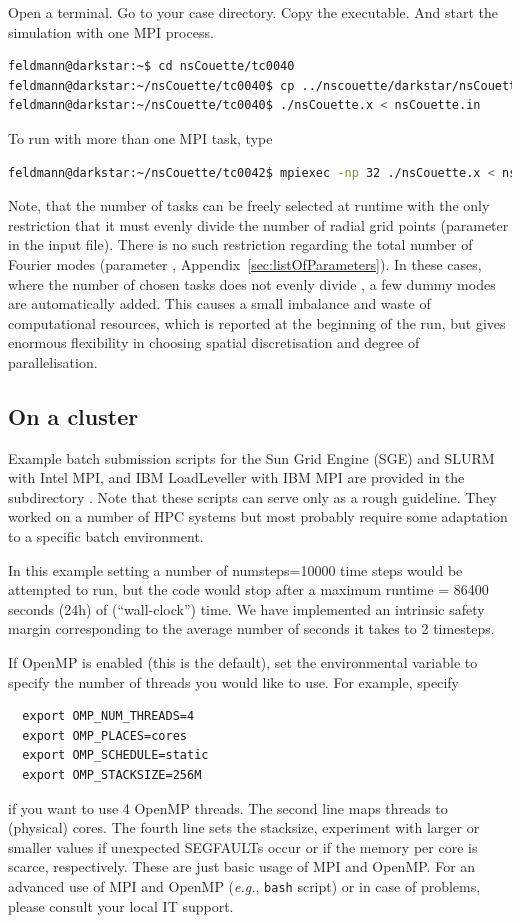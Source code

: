 \documentclass[a4paper, 11pt, DIV=11]{scrartcl}
\begin{document}
Open a terminal. Go to your case directory. Copy the executable. And start the simulation with one MPI process.
\begin{lstlisting}[language=bash]
feldmann@darkstar:~$ cd nsCouette/tc0040
feldmann@darkstar:~/nsCouette/tc0040$ cp ../nscouette/darkstar/nsCouette.x .
feldmann@darkstar:~/nsCouette/tc0040$ ./nsCouette.x < nsCouette.in
\end{lstlisting}
To run \nsc with more than one MPI task, type
\begin{lstlisting}[language=bash]
feldmann@darkstar:~/nsCouette/tc0042$ mpiexec -np 32 ./nsCouette.x < nsCouette.in
\end{lstlisting}
Note, that the number of \mpi tasks can be freely selected at runtime with the only
restriction that it must evenly divide the number of radial grid points (parameter
 in the input file). There is no such restriction regarding the total number
of Fourier modes (parameter , Appendix~\ref{sec:listOfParameters}). In these
cases, where the number of chosen \mpi tasks does not evenly divide , a few
dummy modes are automatically added. This causes a small imbalance and waste of
computational resources, which is reported at the beginning of the run, but gives
enormous flexibility in choosing spatial discretisation and degree of parallelisation.


\subsection{On a cluster}
\label{sec:onCluster}

Example batch submission scripts for the Sun Grid Engine (SGE) and
SLURM with Intel MPI, and IBM LoadLeveller with IBM MPI are provided
in the subdirectory . Note that these scripts can serve only
as a rough guideline. They worked on a number of HPC systems but most
probably require some adaptation to a specific batch environment.


In this example setting a number of numsteps=10000 time steps would be
attempted to run, but the code would stop after a maximum runtime =
86400 seconds (24h) of (``wall-clock'') time. We have implemented an intrinsic
safety margin corresponding to the average number of seconds it takes to 2
timesteps.

If OpenMP is enabled (this is the default), set the 
environmental variable to specify the number of threads you would like to use. 
For example, specify
\begin{verbatim}
  export OMP_NUM_THREADS=4
  export OMP_PLACES=cores
  export OMP_SCHEDULE=static
  export OMP_STACKSIZE=256M
\end{verbatim}
if you want to use 4 OpenMP threads. The second line maps threads to
(physical) cores. The fourth line sets the stacksize, experiment with
larger or smaller values if unexpected SEGFAULTs occur or if the
memory per core is scarce, respectively.
These are just basic usage of MPI and OpenMP. 
For an advanced use of MPI and OpenMP (\textit{e.g.}, \verb+bash+ script) or in 
case of problems, please consult your local IT support.
\end{document}
